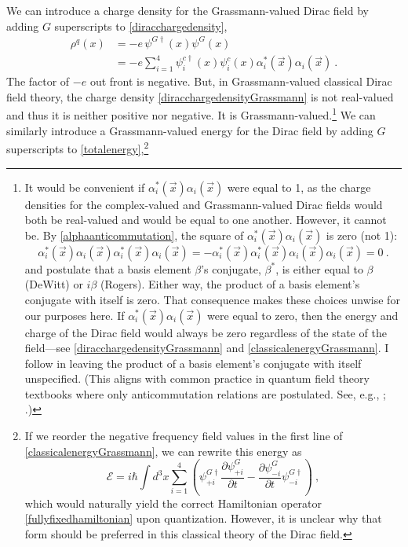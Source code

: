 \documentclass[onecolumn,secnumarabic,amsmath,amssymb,balancelastpage,nofootinbib]{article}
\begin{document}
We can introduce a charge density for the Grassmann-valued Dirac field by adding $G$ superscripts to \eqref{diracchargedensity},
\begin{align}
\rho^q(x)&=-e\, \psi^{G\dagger}(x) \psi^G(x)
\nonumber
\\
&= -e \sum_{i=1}^{4}\psi^{c\dagger}_i(x)\psi^c_i(x) \alpha^{*}_i(\vec{x})\alpha_i(\vec{x})   
\ .
\label{diracchargedensityGrassmann}
\end{align}
The factor of $-e$ out front is negative.  But, in Grassmann-valued classical Dirac field theory, the charge density \eqref{diracchargedensityGrassmann} is not real-valued and thus it is neither positive nor negative. It is Grassmann-valued.\footnote{It would be convenient if $\alpha_i^*(\vec{x})\alpha_i(\vec{x})$ were equal to 1, as the charge densities for the complex-valued and Grassmann-valued Dirac fields would both be real-valued and would be equal to one another.  However, it cannot be.  By \eqref{alphaanticommutation}, the square of $\alpha_i^*(\vec{x})\alpha_i(\vec{x})$ is zero (not 1):
\begin{equation}
\alpha_i^*(\vec{x})\alpha_i(\vec{x})\alpha_i^*(\vec{x})\alpha_i(\vec{x})=-\alpha_i^*(\vec{x})\alpha_i^*(\vec{x})\alpha_i(\vec{x})\alpha_i(\vec{x})=0
\ .
\end{equation}
\citet[pg.\ 6]{dewitt1992} and \citet[pg.\ 24]{rogers2007} postulate that a basis element $\beta$'s conjugate, $\beta^*$, is either equal to $\beta$ (DeWitt) or $i \beta$ (Rogers).  Either way, the product of a basis element's conjugate with itself is zero.  That consequence makes these choices unwise for our purposes here.  If $\alpha_i^*(\vec{x})\alpha_i(\vec{x})$ were equal to zero, then the energy and charge of the Dirac field would always be zero regardless of the state of the field---see \eqref{diracchargedensityGrassmann} and \eqref{classicalenergyGrassmann}.  I follow \citet[pg.\ 66--67]{berezin} in leaving the product of a basis element's conjugate with itself unspecified.  (This aligns with common practice in quantum field theory textbooks where only anticommutation relations are postulated.  See, e.g., \citealp[sec.\ 10.3.2]{duncan}; \citealp[sec.\ 14.6]{schwartz}.)}  We can similarly introduce a Grassmann-valued energy for the Dirac field by adding $G$ superscripts to \eqref{totalenergy},\footnote{If we reorder the negative frequency field values in the first line of \eqref{classicalenergyGrassmann}, we can rewrite this energy as
\begin{equation}
\mathcal{E}=i \hbar\int{d^3 x \sum_{i=1}^{4}  \left( \psi_{+i}^{G\dagger}\frac{\partial \psi^G_{+i}}{\partial t} - \frac{\partial \psi^G_{-i}}{\partial t}\psi_{-i}^{G\dagger}\right)}
\label{fullyfixedenergy}
\ ,
\end{equation}
which would naturally yield the correct Hamiltonian operator \eqref{fullyfixedhamiltonian} upon quantization.  However, it is unclear why that form should be preferred in this classical theory of the Dirac field.}
\end{document}
